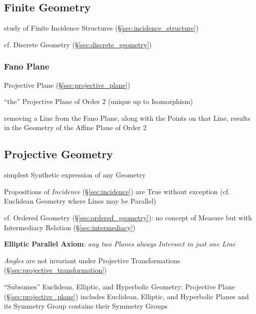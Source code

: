 \subsection{Finite Geometry}\label{sec:finite_geometry}

study of Finite Incidence Structures (\S\ref{sec:incidence_structure})

cf. Discrete Geometry (\S\ref{sec:discrete_geometry})



\subsubsection{Fano Plane}\label{sec:fano_plane}

Projective Plane (\S\ref{sec:projective_plane})

``the'' Projective Plane of Order $2$ (unique up to Isomorphism)

removing a Line from the Fano Plane, along with the Points on that Line, results
in the Geometry of the Affine Plane of Order 2



\subsection{Projective Geometry}\label{sec:projective_geometry}

simplest Synthetic expression of any Geometry

Propositions of \emph{Incidence} (\S\ref{sec:incidence}) are True without
exception (cf. Euclidean Geometry where Lines may be Parallel)

\fist cf. Ordered Geometry (\S\ref{sec:ordered_geometry}): no concept of Measure
but with Intermediacy Relation (\S\ref{sec:intermediacy})

\textbf{Elliptic Parallel Axiom}: \emph{any two Planes always Intersect in just
  one Line}

\emph{Angles} are not invariant under Projective Transformations
(\S\ref{sec:projective_transformation})

``Subsumes'' Euclidean, Elliptic, and Hyperbolic Geometry: Projective
Plane (\S\ref{sec:projective_plane}) includes Euclidean, Elliptic, and
Hyperbolic Planes and its Symmetry Group contains their Symmetry
Groups

